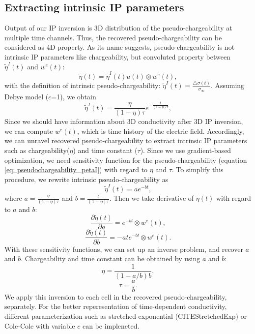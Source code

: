 \documentclass[a4paper, 11pt]{article}
\newcommand{\siginf}{\sigma_\infty}
\newcommand{\dsig}{\triangle\sigma}
\newcommand{\peta}{\tilde{\eta}}
\begin{document}
\subsection{Extracting intrinsic IP parameters}
\label{section: extract_intrinsicIP}
Output of our IP inversion is 3D distribution of the pseudo-chargeability at multiple time channels. 
Thus, the recovered pseudo-chargeability can be considered as 4D property. 
As its name suggests, pseudo-chargeability is not intrinsic IP parameters like chargeability, but convoluted property between $\peta^{I}(t)$ and $w^{e}(t)$:
\begin{equation}
  \peta(t) = \peta^{I}(t)u(t) \otimes w^e(t),
  \label{eq: pseudochargeability_petaI}
\end{equation}
with the definition of intrinsic pseudo-chargeability: $\peta^I(t)  = \frac{\dsig(t)}{\siginf}$.
Assuming Debye model ($c$=1), we obtain
\begin{equation}
    \peta^{I}(t) = \frac{\eta}{(1-\eta)\tau}e^{-\frac{t}{(1-\eta)\tau}},
    \label{eq: intrinsic_peta_debye}
\end{equation}
Since we should have information about 3D conductivity after 3D IP inversion, we can compute $w^e(t)$, which is time history of the electric field. 
Accordingly, we can unravel recovered pseudo-chargeability to extract intrinsic IP parameters such as chargeability($\eta$) and time constant ($\tau$). 
Since we use gradient-based optimization, we need sensitivity function for the pseudo-chargeability (equation \ref{eq: pseudochargeability_petaI}) with regard to $\eta$ and $\tau$. 
To simplify this procedure, we rewrite intrinsic pseudo-chargeability as 
\begin{equation}
  \peta^{I}(t) = a e^{-bt},
\end{equation}
where $a = \frac{\eta}{(1-\eta)\tau}$ and $b = \frac{t}{(1-\eta)\tau}$. 
Then we take derivative of $\peta(t)$ with regard to $a$ and $b$:
\begin{equation}
  \frac{\partial \peta(t)}{\partial a} = e^{-bt} \otimes w^e(t),
\end{equation}
\begin{equation}
  \frac{\partial \peta(t)}{\partial b} = -ate^{-bt} \otimes w^e(t).
\end{equation}
With these sensitivity functions, we can set up an inverse problem, and recover $a$ and $b$. 
Chargeability and time constant can be obtained by using $a$ and $b$:
\begin{equation}
  \eta =  \frac{1}{(1-a/b)b},
\end{equation}
\begin{equation}
  \tau =  \frac{a}{b}.
\end{equation}
We apply this inversion to each cell in the recovered pseudo-chargeability, separately. 
For the better reperesentation of time-dependent conductivity, different parameterization such as stretched-exponential (CITEStretchedExp) or Cole-Cole with variable $c$ can be impleneted. 
\end{document}
